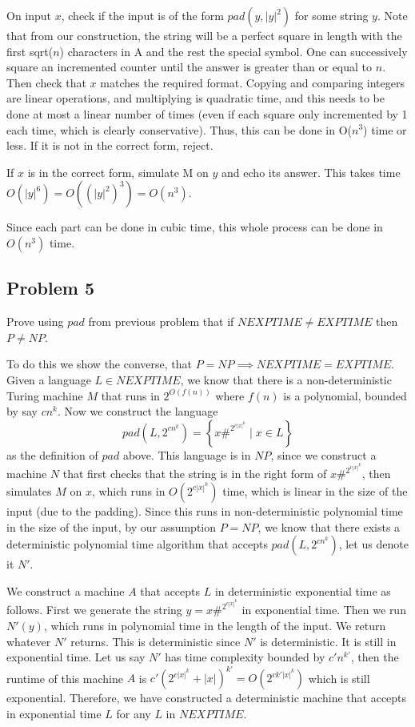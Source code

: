 \documentclass[english]{article}
\begin{document}
On input $x$, check if the input is of the form $pad(y,|y|^2)$ for some string $y$. Note that from our construction, the string will be a perfect square in length with the first sqrt($n$) characters in A and the rest the special symbol. One can successively square an incremented counter until the answer is greater than or equal to $n$. Then check that $x$ matches the required format. Copying and comparing integers are linear operations, and multiplying is quadratic time, and this needs to be done at most a linear number of times (even if each square only incremented by 1 each time, which is clearly conservative). Thus, this can be done in O($n^3$) time or less. If it is not in the correct form, reject.

If $x$ is in the correct form, simulate M on $y$ and echo its answer. This takes time $O(|y|^6) = O((|y|^2)^3) = O(n^3)$.

Since each part can be done in cubic time, this whole process can be done in $O(n^3)$ time.

\subsection*{Problem 5}
Prove using $pad$ from previous problem that if $NEXPTIME \neq EXPTIME$ then $P \neq NP$. 

To do this we show the converse, that $P = NP \implies NEXPTIME = EXPTIME$. Given a language $L \in NEXPTIME$, we
know that there is a non-deterministic Turing machine $M$ that runs in $2^{O(f(n))}$ where $f(n)$ is a polynomial,
bounded by say $c n^k$. Now we construct the language
\[ pad(L,2^{c n^k}) = \left\{ x\#^{2^{c |x|^k}} \mid x \in L \right\} \]
as the definition of $pad$ above. This language is in $NP$, since we construct a machine $N$ that first checks that
the string is in the right form of $x\#^{2^{c |x|^k}}$, then simulates $M$ on $x$, which runs in $O(2^{c |x|^k})$
time, which is linear in the size of the input (due to the padding). Since this runs in non-deterministic polynomial
time in the size of the input, by our assumption $P = NP$, we know that there exists a deterministic polynomial time
algorithm that accepts $pad(L,2^{c n^k})$, let us denote it $N'$.

We construct a machine $A$ that accepts $L$ in deterministic exponential time as follows. First we generate the
string $y = x\#^{2^{c |x|^k}}$ in exponential time. Then we run $N'(y)$, which runs in polynomial time in 
the length of the input. We return whatever $N'$ returns. This is deterministic since $N'$ is deterministic. It
is still in exponential time. Let us say $N'$ has time complexity bounded by $c' n^{k'}$, then the runtime of this
machine $A$ is $c'\left(2^{c |x|^k} + |x|\right)^{k'} = O(2^{ck' |x|^k})$ which is still exponential. Therefore,
we have constructed a deterministic machine that accepts in exponential time $L$ for any $L$ in $NEXPTIME$.
\end{document}
